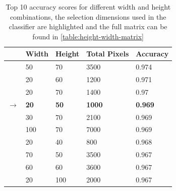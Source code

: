 \begin{table}[H]

    \begin{tabularx}{\textwidth}{ r X X X X }
    \toprule
    & Width & Height & Total Pixels & Accuracy \\
    \midrule
    & 50  & 70  & 3500 & 0.974 \\
    & 20  & 60  & 1200 & 0.971 \\
    & 20  & 70  & 1400 & 0.97 \\
    $\rightarrow$ & \textbf{20}  & \textbf{50}  & \textbf{1000} & \textbf{0.969} \\
    & 30  & 70  & 2100 & 0.969 \\
    & 100 & 70  & 7000 & 0.969 \\
    & 20  & 40  & 800  & 0.968 \\
    & 70  & 50  & 3500 & 0.967 \\
    & 60  & 60  & 3600 & 0.967 \\
    & 20  & 100 & 2000 & 0.967 \\
    \bottomrule
    \end{tabularx}

    \caption{Top 10 accuracy scores for different width and height combinations, the selection dimensions used in the classifier are highlighted and the full matrix can be found in \cref{table:height-width-matrix}}
    \label{table:knn-width-height-top}
\end{table}

